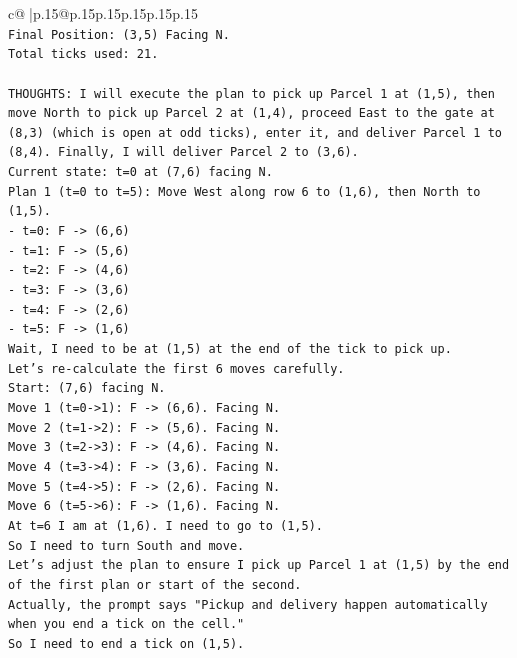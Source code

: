 \documentclass{article}
\begin{document}
{\begin{supertabular}{c@{$\;$}|p{.15\linewidth}@{}p{.15\linewidth}p{.15\linewidth}p{.15\linewidth}p{.15\linewidth}p{.15\linewidth}}
{{{\\ 
\texttt{Final Position: (3,5) Facing N.} \\
\texttt{Total ticks used: 21.} \\
\\ 
\texttt{THOUGHTS: I will execute the plan to pick up Parcel 1 at (1,5), then move North to pick up Parcel 2 at (1,4), proceed East to the gate at (8,3) (which is open at odd ticks), enter it, and deliver Parcel 1 to (8,4). Finally, I will deliver Parcel 2 to (3,6).} \\
\texttt{Current state: t=0 at (7,6) facing N.} \\
\texttt{Plan 1 (t=0 to t=5): Move West along row 6 to (1,6), then North to (1,5).} \\
\texttt{{-} t=0: F {-}> (6,6)} \\
\texttt{{-} t=1: F {-}> (5,6)} \\
\texttt{{-} t=2: F {-}> (4,6)} \\
\texttt{{-} t=3: F {-}> (3,6)} \\
\texttt{{-} t=4: F {-}> (2,6)} \\
\texttt{{-} t=5: F {-}> (1,6)} \\
\texttt{Wait, I need to be at (1,5) at the end of the tick to pick up.} \\
\texttt{Let's re{-}calculate the first 6 moves carefully.} \\
\texttt{Start: (7,6) facing N.} \\
\texttt{Move 1 (t=0{-}>1): F {-}> (6,6). Facing N.} \\
\texttt{Move 2 (t=1{-}>2): F {-}> (5,6). Facing N.} \\
\texttt{Move 3 (t=2{-}>3): F {-}> (4,6). Facing N.} \\
\texttt{Move 4 (t=3{-}>4): F {-}> (3,6). Facing N.} \\
\texttt{Move 5 (t=4{-}>5): F {-}> (2,6). Facing N.} \\
\texttt{Move 6 (t=5{-}>6): F {-}> (1,6). Facing N.} \\
\texttt{At t=6 I am at (1,6). I need to go to (1,5).} \\
\texttt{So I need to turn South and move.} \\
\texttt{Let's adjust the plan to ensure I pick up Parcel 1 at (1,5) by the end of the first plan or start of the second.} \\
\texttt{Actually, the prompt says "Pickup and delivery happen automatically when you end a tick on the cell."} \\
\texttt{So I need to end a tick on (1,5).} \\
}}}
\end{supertabular}}
\end{document}
